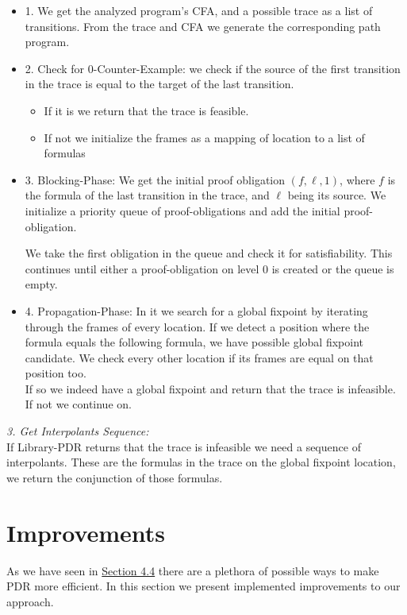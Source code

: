 \documentclass[11pt, a4paper, BCOR=10mm, ngerman]{scrbook}
\begin{document}
\begin{itemize}
	\item 1. We get the analyzed program's CFA, and a possible trace as a list of transitions. From the trace and CFA we generate the corresponding path program.
	\item 2. Check for 0-Counter-Example: we check if the source of the first transition in the trace is equal to the target of the last transition.
	 \begin{itemize}
		\item If it is we return that the trace is feasible.
		\item If not we initialize the frames as a mapping of location to a list of formulas
	 \end{itemize}
	\item 3. Blocking-Phase: We get the initial proof obligation $(f, \ell, 1)$, where $f$ is the formula of the last transition in the trace, and $\ell$ being its source. We initialize a priority queue of proof-obligations and add the initial proof-obligation. \par
	We take the first obligation in the queue and check it for satisfiability. This continues until either a proof-obligation on level 0 is created or the queue is empty.
	
	\item 4. Propagation-Phase: In it we search for a global fixpoint by iterating through the frames of every location. If we detect a position where the formula equals the following formula, we have possible global fixpoint candidate. We check every other location if its frames are equal on that position too. \\
	If so we indeed have a global fixpoint and return that the trace is infeasible. If not we continue on.
	
\end{itemize}
 
\textsl{3. Get Interpolants Sequence:} \\
If Library-PDR returns that the trace is infeasible we need a sequence of interpolants.
These are the formulas in the trace on the global fixpoint location, we return the conjunction of those formulas.
 

\section{Improvements}
As we have seen in \hyperref[improvements]{Section 4.4} there are a plethora of possible ways to make PDR more efficient. In this section we present implemented improvements to our approach.
\end{document}
